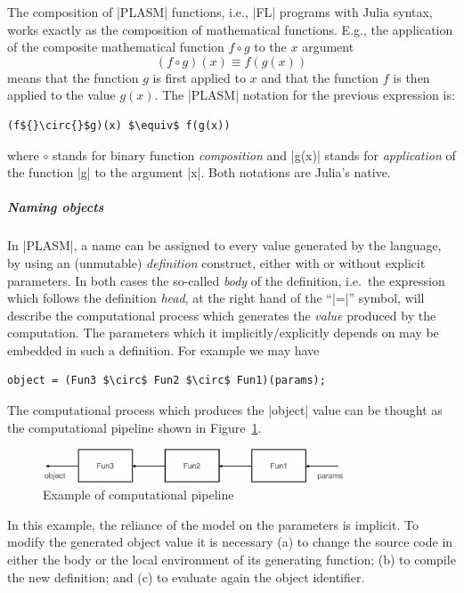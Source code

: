 The composition of |PLASM| functions, i.e., |FL| programs with Julia syntax, works exactly as the composition of mathematical functions.  E.g., the application of the
composite mathematical function $f \circ g$ to the $x$ argument
\[
(f \circ g)(x) \equiv f(g(x))
\]
means that the function $g$ is first applied to $x$ and that the 
function $f$ is then applied to the value $g(x)$.  The |PLASM| notation 
for the previous expression is:
\begin{lstlisting}[language=JuliaLocal, style=julia, mathescape = true]
(f${}\circ{}$g)(x) $\equiv$ f(g(x))
\end{lstlisting}
where $\circ$ stands for binary function \textit{composition} and  
|g(x)| stands for \textit{application} of the function |g| to the 
argument |x|. Both notations are Julia’s native.


\subparagraph{Naming objects}

In |PLASM|, a name can be assigned to every value generated by the
language, by using an (unmutable) \emph{definition} construct, either with or without
explicit parameters.  In both cases the so-called \textit{body} of the
definition, i.e.~the expression which follows the definition
\emph{head}, at the right hand of the ``|=|” symbol, will
describe the computational process which generates the  \emph{value}
produced by the computation.  The parameters which it
implicitly/explicitly depends on may be embedded in such a definition.
For example we may have
\begin{lstlisting}[language=JuliaLocal, style=julia, mathescape = true]
object = (Fun3 $\circ$ Fun2 $\circ$ Fun1)(params);
\end{lstlisting}
The computational process which produces the |object| value can be 
thought as the computational pipeline shown in 
Figure~\ref{fig:1:5:pipeline}.
\begin{figure}[htbp] %
   \centering
   \includegraphics[width=0.8\textwidth]{chapter-01/figs/pipeline.pdf} 
	\caption{Example of computational pipeline}
   \label{fig:1:5:pipeline}
\end{figure}

In this example, the reliance of the model on the 
parameters is implicit.  To modify the generated object value 
it is necessary (a) to change the source code in either the body or 
the local environment of its generating function; (b) to compile the 
new definition; and (c) to evaluate again the object identifier.

